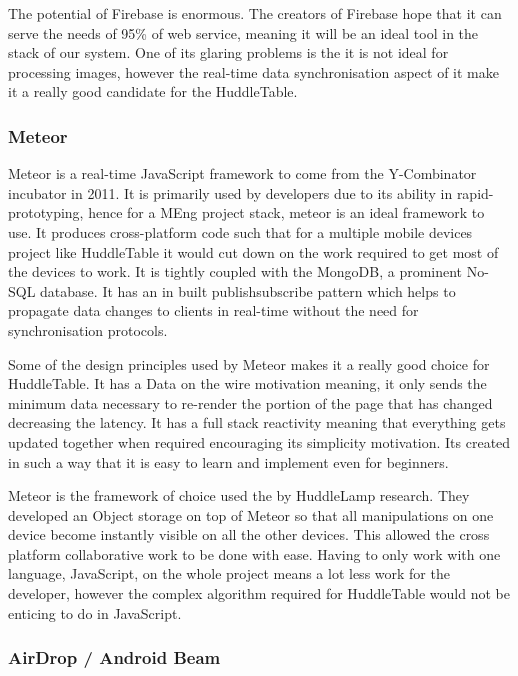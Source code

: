 The potential of Firebase is enormous. The creators of Firebase hope
that it can serve the needs of 95\% of web service\cite{firebase-wired},
meaning it will be an ideal tool in the stack of our system. One of
its glaring problems is the it is not ideal for processing images,
however the real-time data synchronisation aspect of it make it a
really good candidate for the HuddleTable.
 
 
\subsubsection{Meteor}
 
Meteor\cite{meteor} is a real-time JavaScript framework to come from
the Y-Combinator incubator in 2011. It is primarily used by developers
due to its ability in rapid-prototyping, hence for a MEng project
stack, meteor is an ideal framework to use. It produces cross-platform
code such that for a multiple mobile devices project like HuddleTable
it would cut down on the work required to get most of the devices
to work. It is tightly coupled with the MongoDB, a prominent No-SQL
database. It has an in built publish\textendash subscribe pattern\cite{pub-sub-pattern}
which helps to propagate data changes to clients in real-time without
the need for synchronisation protocols.
 
Some of the design principles used by Meteor makes it a really good
choice for HuddleTable. It has a Data on the wire motivation meaning,
it only sends the minimum data necessary to re-render the portion
of the page that has changed decreasing the latency. It has a full
stack reactivity\cite{meteor-wiki} meaning that everything gets updated
together when required encouraging its simplicity motivation. Its
created in such a way that it is easy to learn and implement even
for beginners.
 
Meteor is the framework of choice used the by HuddleLamp research.
They developed an Object storage on top of Meteor so that all manipulations
on one device become instantly visible on all the other devices. This
allowed the cross platform collaborative work to be done with ease.
Having to only work with one language, JavaScript, on the whole project
means a lot less work for the developer, however the complex algorithm
required for HuddleTable would not be enticing to do in JavaScript.
 
 
\subsubsection{AirDrop / Android Beam}
 

